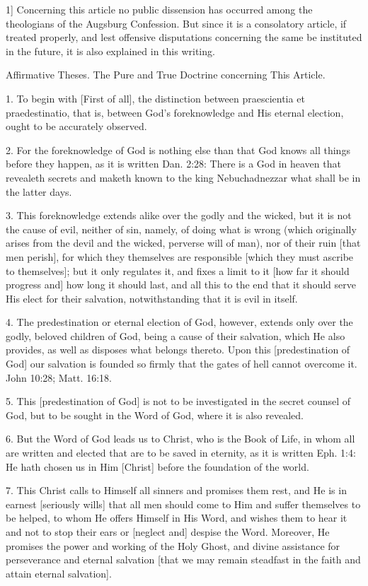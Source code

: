 1] Concerning this article no public dissension has occurred among the theologians of the Augsburg Confession. But since it is a consolatory article, if treated properly, and lest offensive disputations concerning the same be instituted in the future, it is also explained in this writing.

Affirmative Theses.
The Pure and True Doctrine concerning This Article.

1. To begin with [First of all], the distinction between praescientia et praedestinatio, that is, between God's foreknowledge and His eternal election, ought to be accurately observed.

2. For the foreknowledge of God is nothing else than that God knows all things before they happen, as it is written Dan. 2:28: There is a God in heaven that revealeth secrets and maketh known to the king Nebuchadnezzar what shall be in the latter days.

3. This foreknowledge extends alike over the godly and the wicked, but it is not the cause of evil, neither of sin, namely, of doing what is wrong (which originally arises from the devil and the wicked, perverse will of man), nor of their ruin [that men perish], for which they themselves are responsible [which they must ascribe to themselves]; but it only regulates it, and fixes a limit to it [how far it should progress and] how long it should last, and all this to the end that it should serve His elect for their salvation, notwithstanding that it is evil in itself.

4. The predestination or eternal election of God, however, extends only over the godly, beloved children of God, being a cause of their salvation, which He also provides, as well as disposes what belongs thereto. Upon this [predestination of God] our salvation is founded so firmly that the gates of hell cannot overcome it. John 10:28; Matt. 16:18.

5. This [predestination of God] is not to be investigated in the secret counsel of God, but to be sought in the Word of God, where it is also revealed.

6. But the Word of God leads us to Christ, who is the Book of Life, in whom all are written and elected that are to be saved in eternity, as it is written Eph. 1:4: He hath chosen us in Him [Christ] before the foundation of the world.

7. This Christ calls to Himself all sinners and promises them rest, and He is in earnest [seriously wills] that all men should come to Him and suffer themselves to be helped, to whom He offers Himself in His Word, and wishes them to hear it and not to stop their ears or [neglect and] despise the Word. Moreover, He promises the power and working of the Holy Ghost, and divine assistance for perseverance and eternal salvation [that we may remain steadfast in the faith and attain eternal salvation].

